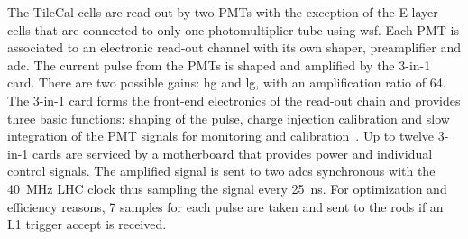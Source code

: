 The TileCal cells are read out by two PMTs with the exception of the E layer
cells that are connected to only one photomultiplier tube using \gls{wsf}. Each
PMT is associated to an electronic read-out channel with its own shaper,
preamplifier and \gls{adc}. The current pulse from the PMTs is shaped and
amplified by the 3-in-1 card. There are two possible gains: \gls{hg} and
\gls{lg}, with an amplification ratio of 64. The 3-in-1 card forms the front-end
electronics of the read-out chain and provides three basic functions: shaping of
the pulse, charge injection calibration and slow integration of the PMT signals
for monitoring and calibration~\cite{TileCal}. Up to twelve 3-in-1 cards are
serviced by a motherboard that provides power and individual control signals.
The amplified signal is sent to two \glspl{adc} synchronous with the 40~MHz LHC
clock thus sampling the signal every 25~ns. For optimization and efficiency
reasons, 7 samples for each pulse are taken and sent to the \glspl{rod} if an L1
trigger accept is received.
